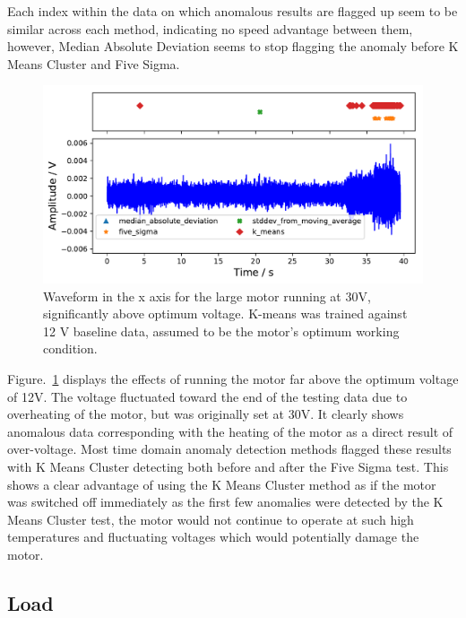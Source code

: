 Each index within the data on which anomalous results are flagged up seem to be similar across each method, indicating no speed advantage between them, however, Median Absolute Deviation seems to stop flagging the anomaly before K Means Cluster and Five Sigma. %

\begin{figure}[t]
    \includegraphics[width=1.0\textwidth]{fig/large_30V_large_12V.pdf}
    \caption[Overvoltage of Large Motor]{Waveform in the x axis for the large motor running at 30V, significantly above optimum voltage. K-means was trained against 12 V baseline data, assumed to be the motor's optimum working condition.}
    \label{fig:largemotor_30V}
\end{figure}

Figure.~\ref{fig:largemotor_30V} displays the effects of running the motor far above the optimum voltage of 12V. The voltage fluctuated toward the end of the testing data due to overheating of the motor, but was originally set at 30V. It clearly shows anomalous data corresponding with the heating of the motor as a direct result of over-voltage. Most time domain anomaly detection methods flagged these results with K Means Cluster detecting both before and after the Five Sigma test. This shows a clear advantage of using the K Means Cluster method as if the motor was switched off immediately as the first few anomalies were detected by the K Means Cluster test, the motor would not continue to operate at such high temperatures and fluctuating voltages which would potentially damage the motor.

\subsection{Load}

